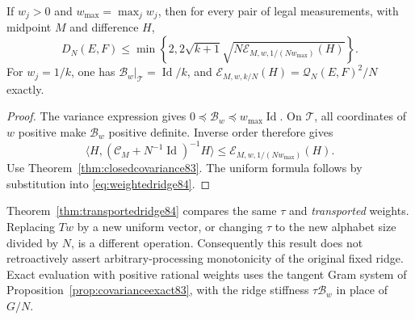 \begin{proposition}\label{prop:ridgeupper84}
If $w_j>0$ and $w_{\max}=\max_jw_j$, then for every pair of legal
measurements, with midpoint $M$ and difference $H$,
\begin{equation}\label{eq:ridgeupper84}
 D_N(E,F)\le\min\left\{2,
 2\sqrt{k+1}\sqrt{N\mathcal E_{M,w,1/(Nw_{\max})}(H)}\right\}.
\end{equation}
For $w_j=1/k$, one has $\mathcal B_w|_{\mathcal T}
=\operatorname{Id}/k$, and
$\mathcal E_{M,w,k/N}(H)=\mathcal Q_N(E,F)^2/N$ exactly.
\end{proposition}
\begin{proof}
The variance expression gives
$0\preceq\mathcal B_w\preceq w_{\max}\operatorname{Id}$.
On $\mathcal T$, all coordinates of $w$ positive make
$\mathcal B_w$ positive definite.  Inverse order therefore gives
\[
 \langle H,(\mathcal C_M+N^{-1}\operatorname{Id})^{-1}H\rangle
 \le\mathcal E_{M,w,1/(Nw_{\max})}(H).
\]
Use Theorem~\ref{thm:closedcovariance83}.  The uniform formula
follows by substitution into \eqref{eq:weightedridge84}.
\end{proof}
Theorem~\ref{thm:transportedridge84} compares the same $\tau$ and
\emph{transported} weights.  Replacing $Tw$ by a new uniform vector,
or changing $\tau$ to the new alphabet size divided by $N$, is a
different operation.  Consequently this result does not retroactively
assert arbitrary-processing monotonicity of the original fixed ridge.
Exact evaluation with positive rational weights uses the tangent Gram
system of Proposition~\ref{prop:covarianceexact83}, with the ridge
stiffness $\tau\mathcal B_w$ in place of $G/N$.
